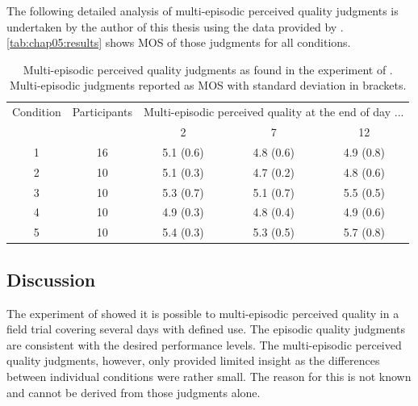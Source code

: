 The following detailed analysis of multi-episodic perceived quality judgments is undertaken by the author of this thesis using the data provided by \cite{moller_single-call_2011}.
\autoref{tab:chap05:results} shows \ac{MOS} of those judgments for all conditions.


\begin{table}[h]
	\centering
	\begin{tabular}{|c|c||c|c|c|}
	Condition 	& Participants 	& \multicolumn{3}{|c|}{Multi-episodic perceived quality at the end of day ...} \\
				&				& 2	& 7 & 12 \\
	\hline
	1 			& 16 			& 5.1 (0.6) & 4.8 (0.6) & 4.9 (0.8) \\
	2 			& 10 			& 5.1 (0.3) & 4.7 (0.2) & 4.8 (0.6) \\
	3 			& 10 			& 5.3 (0.7) & 5.1 (0.7) & 5.5 (0.5) \\
	4 			& 10 			& 4.9 (0.3) & 4.8 (0.4) & 4.9 (0.6) \\
	5 			& 10 			& 5.4 (0.3) & 5.3 (0.5) & 5.7 (0.8) \\
	\hline
	\end{tabular}
	\caption{Multi-episodic perceived quality judgments as found in the experiment of \cite{moller_single-call_2011}. Multi-episodic judgments reported as \ac{MOS} with standard deviation in brackets.}
	\label{tab:chap05:results}
\end{table}

\subsection{Discussion}
The experiment of \cite{moller_single-call_2011} showed it is possible to multi-episodic perceived quality in a field trial covering several days with defined use.
The episodic quality judgments are consistent with the desired performance levels.
The multi-episodic perceived quality judgments, however, only provided limited insight as the differences between individual conditions were rather small.
The reason for this is not known and cannot be derived from those judgments alone.

